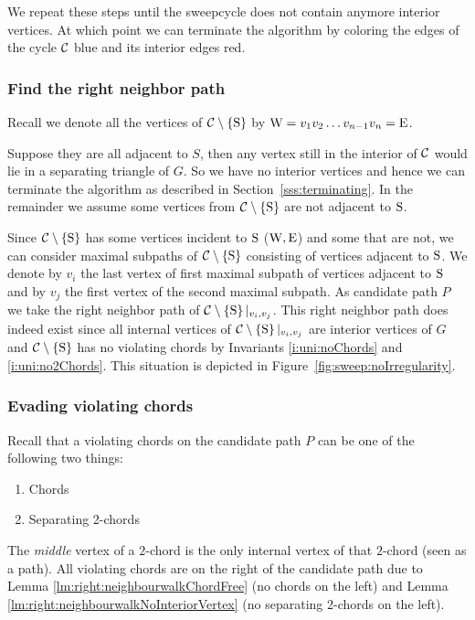 We repeat these steps until the sweepcycle does not contain anymore interior vertices. At which point we can terminate the algorithm by coloring the edges of the cycle $\mathcal{C}$ blue and its interior edges red.

\subsubsection{Find the right neighbor path}
  Recall we denote all the vertices of $\mathcal{C} \setminus \left\lbrace {\mathrm{S}} \right\rbrace$ by $\mathrm{W} =  v_1   v_2   \ldots v_{n-1}   v_n = \mathrm{E}$.

  Suppose they are all adjacent to $S$, then any vertex still in the interior of $\mathcal{C}$ would lie in a separating triangle of $G$. So we have no interior vertices and hence we can terminate the algorithm as described in Section~\ref{sss:terminating}.
  In the remainder we assume some vertices from $\mathcal{C} \setminus \left\lbrace {\mathrm{S}} \right\rbrace$ are not adjacent to $\mathrm{S}$.

  Since $\mathcal{C} \setminus \left\lbrace {\mathrm{S}} \right\rbrace$ has some vertices incident to $\mathrm{S}$ ($\mathrm{W} , \mathrm{E}$) and some that are not, we can consider maximal subpaths of $\mathcal{C} \setminus \left\lbrace {\mathrm{S}} \right\rbrace$ consisting of vertices adjacent to $\mathrm{S}$.
  We denote by $v_i$ the last vertex of first maximal subpath of vertices adjacent to $\mathrm{S}$ and by $v_j$ the first vertex of the second maximal subpath.
  As candidate path $P$ we take the right neighbor path of $\mathcal{C} \setminus \left\lbrace {\mathrm{S}} \right\rbrace|_{v_i, v_j}$. This right neighbor path does indeed exist since all internal vertices of $\mathcal{C} \setminus \left\lbrace {\mathrm{S}} \right\rbrace|_{v_i, v_j}$ are interior vertices of $G$ and $\mathcal{C} \setminus \left\lbrace {\mathrm{S}} \right\rbrace$ has no violating chords by Invariants \ref{i:uni:noChords} and \ref{i:uni:no2Chords}.
  This situation is depicted in Figure~\ref{fig:sweep:noIrregularity}.

\subsubsection{Evading violating chords}
  Recall that a violating chords on the candidate path $P$ can be one of the following two things:
  \begin{enumerate}
    \itemsep=-4pt
    \item Chords
    \item Separating 2-chords
  \end{enumerate}

  The \emph{middle} vertex of a $2$-chord is the only internal vertex of that $2$-chord (seen as a path).
  All violating chords are on the right of the candidate path due to Lemma \ref{lm:right:neighbourwalkChordFree} (no chords on the left) and Lemma \ref{lm:right:neighbourwalkNoInteriorVertex} (no separating 2-chords on the left).

